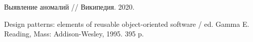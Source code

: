 \begingroup 
\renewcommand{\section}[2]{\newpage\anonsection{Библиографический список}}
\begin{thebibliography}{00}
	
	Выявление аномалий // Википедия. 2020.
	
	Design patterns: elements of reusable object-oriented software / ed. Gamma E. Reading, Mass: Addison-Wesley, 1995. 395 p.
	
	
\end{thebibliography}
\endgroup

\clearpage